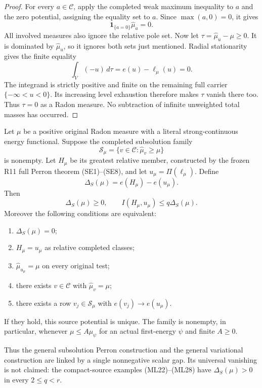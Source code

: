 \begin{proof}
For every $a\in\mathscr C$, apply the completed weak
maximum inequality to $a$ and the zero potential, assigning
the equality set to $a$. Since $\max(a,0)=0$, it gives
\[
                   \mathbf1_{\{a=0\}}\widehat\mu_a=0.
 \tag{PV6}
\]
All involved measures also ignore the relative pole set.
Now let $\tau=\widehat\mu_u-\mu\geq0$. It is dominated
by $\widehat\mu_u$, so it ignores both sets just mentioned.
Radial stationarity gives the finite equality
\[
                       \int_V(-u)\,d\tau
                                  =e(u)-\ell_\mu(u)=0.
\]
The integrand is strictly positive and finite on the
remaining full carrier $\{-\infty<u<0\}$. Its increasing
level exhaustion therefore makes $\tau$ vanish there too.
Thus $\tau=0$ as a Radon measure. No subtraction of
infinite unweighted total masses has occurred.
\end{proof}

\begin{theorem}
\label{thm:r12-perron-variational-gap}
Let $\mu$ be a positive original Radon measure with a
literal strong-continuous energy functional. Suppose the
completed subsolution family
\[
             \mathscr S_\mu
               =\{v\in\mathscr C:\widehat\mu_v\geq\mu\}
 \tag{PV7}
\]
is nonempty. Let $H_\mu$ be its greatest relative member,
constructed by the frozen R11 full Perron theorem (SE1)--(SE8),
and let $u_\mu=\Pi(\ell_\mu)$. Define
\[
                  \Delta_S(\mu)=e(H_\mu)-e(u_\mu).
 \tag{PV8}
\]
Then
\[
              \Delta_S(\mu)\geq0,\qquad
              I(H_\mu,u_\mu)\leq q\Delta_S(\mu).
 \tag{PV9}
\]
Moreover the following conditions are equivalent:
\begin{enumerate}
\item $\Delta_S(\mu)=0$;
\item $H_\mu=u_\mu$ as relative completed classes;
\item $\widehat\mu_{u_\mu}=\mu$ on every original test;
\item there exists $v\in\mathscr C$ with $\widehat\mu_v=\mu$;
\item there exists a row $v_j\in\mathscr S_\mu$ with
      $e(v_j)\to e(u_\mu)$.
\end{enumerate}
If they hold, this source potential is unique. The family
is nonempty, in particular, whenever $\mu\leq A\mu_\psi$
for an actual first-energy $\psi$ and finite $A\geq0$.

Thus the general subsolution Perron construction and the
general variational construction are linked by a single
nonnegative scalar gap. Its universal vanishing is not
claimed: the compact-source examples (ML22)--(ML28) have
$\Delta_S(\mu)>0$ in every $2\leq q<r$.
\end{theorem}

